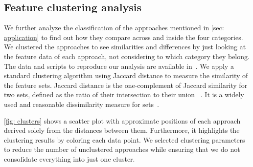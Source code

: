 \documentclass[runningheads]{llncs}
\begin{document}



\subsection{Feature clustering analysis}

We further analyze the classification of the approaches mentioned in \autoref{sec: application} to find out how they compare across and inside the four categories.
We clustered the approaches to see similarities and differences by just looking at the feature data of each approach, not considering to which category they belong.
The data and scripts to reproduce our analysis are available in~\cite{timkrauterArtifactsCoordination2024}.
We apply a standard clustering algorithm using Jaccard distance to measure the similarity of the feature sets.
Jaccard distance is the one-complement of Jaccard similarity for two sets, defined as the ratio of their intersection to their union ~\cite{levandowskyDistanceSets1971}.
It is a widely used and reasonable dissimilarity measure for sets~\cite{levandowskyDistanceSets1971}.

\autoref{fig: clusters} shows a scatter plot with approximate positions of each approach derived solely from the distances between them.
Furthermore, it highlights the clustering results by coloring each data point.
We selected clustering parameters to reduce the number of unclustered approaches while ensuring that we do not consolidate everything into just one cluster.
\end{document}
